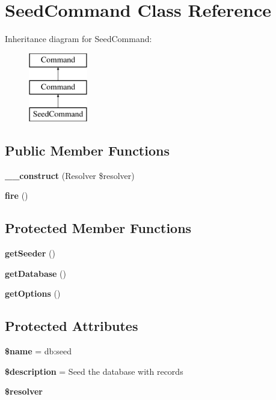 \section{Seed\+Command Class Reference}
\label{class_illuminate_1_1_database_1_1_console_1_1_seed_command}
Inheritance diagram for Seed\+Command\+:\begin{figure}[H]
\begin{center}
\leavevmode
\includegraphics[height=3.000000cm]{class_illuminate_1_1_database_1_1_console_1_1_seed_command}
\end{center}
\end{figure}
\subsection*{Public Member Functions}
\begin{DoxyCompactItemize}
\item 
{\bf \+\_\+\+\_\+construct} (Resolver \$resolver)
\item 
{\bf fire} ()
\end{DoxyCompactItemize}
\subsection*{Protected Member Functions}
\begin{DoxyCompactItemize}
\item 
{\bf get\+Seeder} ()
\item 
{\bf get\+Database} ()
\item 
{\bf get\+Options} ()
\end{DoxyCompactItemize}
\subsection*{Protected Attributes}
\begin{DoxyCompactItemize}
\item 
{\bf \$name} = \textquotesingle{}db\+:seed\textquotesingle{}
\item 
{\bf \$description} = \textquotesingle{}Seed the database with records\textquotesingle{}
\item 
{\bf \$resolver}
\end{DoxyCompactItemize}


